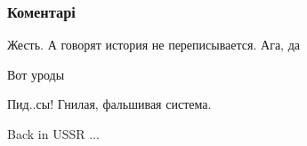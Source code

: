  
 
 
 
 
\subsubsection{Коментарі}
\label{sec:30_07_2021.fb.jacenko_andrej.diezel.gringrey.ukr.2.ej_vy_tam_naverhu.cmt}

\begin{itemize}
 
Жесть. А говорят история не переписывается. Ага, да

 
Вот уроды

 
Пид..сы! Гнилая, фальшивая система.

 
Back in USSR ...

 

\end{itemize}
